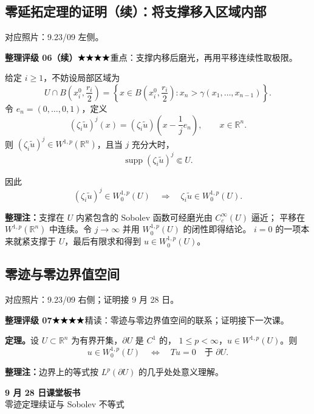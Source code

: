 \documentclass[UTF8,a4paper,11pt,fontset=fandol]{ctexart}
\newcommand{\R}{\mathbb R}
\newcommand{\ednote}[1]{\par{\small\color{notegray}\textbf{整理注：}#1}\par}
\newcommand{\source}[1]{{\small\color{notegray}对应照片：#1。}\par}
\newcommand{\proofstars}[1]{\ensuremath{%
\ifnum#1>0\relax\bigstar\fi
\ifnum#1>1\relax\bigstar\fi
\ifnum#1>2\relax\bigstar\fi
\ifnum#1>3\relax\bigstar\fi
\ifnum#1>4\relax\bigstar\fi}}
\newcommand{\proofrating}[3]{\par{\small\color{proofblue}%
\textbf{整理评级 #1}\enspace\proofstars{#2}\quad #3\par}}
\begin{document}
\subsection*{零延拓定理的证明（续）：将支撑移入区域内部}
\source{9.23/09 左侧}
\proofrating{06（续）}{4}{重点：支撑内移后磨光，再用平移连续性取极限。}
给定 $i\geq1$，不妨设局部区域为
\[
U\cap B\left(x_i^0,\frac{r_i}{2}\right)
=\left\{x\in B\left(x_i^0,\frac{r_i}{2}\right):
x_n>\gamma(x_1,\ldots,x_{n-1})\right\}.
\]
令 $e_n=(0,\ldots,0,1)$，定义
\[
(\zeta_i\widetilde u)^j(x)
=(\zeta_i\widetilde u)\left(x-\frac1j e_n\right),\qquad x\in\R^n.
\]
则 $(\zeta_i\widetilde u)^j\in W^{1,p}(\R^n)$，且当 $j$ 充分大时，
\[
\operatorname{supp}(\zeta_i\widetilde u)^j\Subset U.
\]
\begin{center}
\end{center}
因此
\[
(\zeta_i\widetilde u)^j\in W_0^{1,p}(U)
\quad\Longrightarrow\quad\zeta_i\widetilde u\in W_0^{1,p}(U).
\]
\ednote{支撑在 $U$ 内紧包含的 Sobolev 函数可经磨光由 $C_c^\infty(U)$ 逼近；
平移在 $W^{1,p}(\R^n)$ 中连续。令 $j\to\infty$ 并用 $W_0^{1,p}(U)$ 的闭性即得结论。
$i=0$ 的一项本来就紧支撑于 $U$，最后有限求和得到 $u\in W_0^{1,p}(U)$。}

\subsection{零迹与零边界值空间}
\source{9.23/09 右侧；证明接 9 月 28 日}
\proofrating{07}{4}{精读：零迹与零边界值空间的联系；证明接下一次课。}
\textbf{定理。}设 $U\subset\R^n$ 为有界开集，$\partial U$ 是 $C^1$ 的，
$1\leq p<\infty$，$u\in W^{1,p}(U)$。则
\[
\boxed{u\in W_0^{1,p}(U)\quad\Longleftrightarrow\quad Tu=0\quad\text{于 }\partial U.}
\]
\ednote{边界上的等式按 $L^p(\partial U)$ 的几乎处处意义理解。}
\clearpage
{}
\begin{center}
{\LARGE\bfseries 9 月 28 日课堂板书}\\[4pt]
{零迹定理续证与 Sobolev 不等式}
\end{center}
\end{document}
